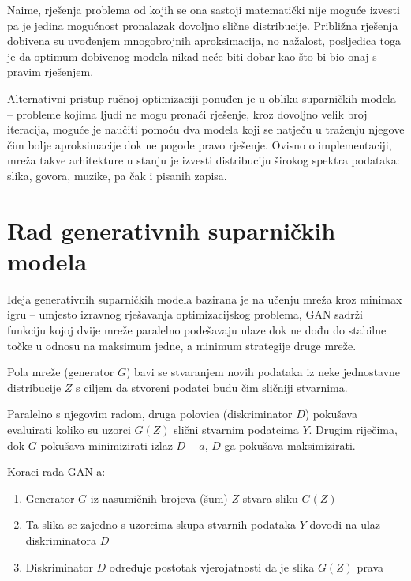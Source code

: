\documentclass[lmodern, utf8, seminar]{fer}
\begin{document}
Naime, rješenja problema od kojih se ona sastoji matematički nije moguće izvesti \cite{goodfellow2014generative} pa je jedina mogućnost pronalazak dovoljno slične distribucije. Približna rješenja dobivena su uvođenjem mnogobrojnih aproksimacija, no nažalost, posljedica toga je da optimum dobivenog modela nikad neće biti dobar kao što bi bio onaj s pravim rješenjem.
\newline

Alternativni pristup ručnoj optimizaciji ponuđen je u obliku suparničkih modela -- probleme kojima ljudi ne mogu pronaći rješenje, kroz dovoljno velik broj iteracija, moguće je naučiti pomoću dva modela koji se natječu u traženju njegove čim bolje aproksimacije dok ne pogode pravo rješenje. Ovisno o implementaciji, mreža takve arhitekture u stanju je izvesti distribuciju širokog spektra podataka: slika, govora, muzike, pa čak i pisanih zapisa.
\newline



\section{Rad generativnih suparničkih modela}
Ideja generativnih suparničkih modela bazirana je na učenju mreža kroz minimax igru -- umjesto izravnog rješavanja optimizacijskog problema, GAN sadrži funkciju kojoj dvije mreže paralelno podešavaju ulaze dok ne dođu do stabilne točke u odnosu na maksimum jedne, a minimum strategije druge mreže. 
\newline

Pola mreže (generator $G$) bavi se stvaranjem novih podataka iz neke jednostavne distribucije $Z$ s ciljem da stvoreni podatci budu čim sličniji stvarnima. 

Paralelno s njegovim radom, druga polovica (diskriminator $D$) pokušava evaluirati koliko su uzorci $G(Z)$ slični stvarnim podatcima $Y$. Drugim riječima, dok $G$ pokušava minimizirati izlaz $D-a$, $D$ ga pokušava maksimizirati.
\newline
\newpage

Koraci rada GAN-a:
\begin{enumerate} 
\item Generator $G$ iz nasumičnih brojeva (šum) $Z$ stvara sliku $G(Z)$
\item Ta slika se zajedno s uzorcima skupa stvarnih podataka $Y$ dovodi na ulaz diskriminatora $D$
\item Diskriminator $D$ određuje postotak vjerojatnosti da je slika $G(Z)$ prava
\end{enumerate}
\end{document}
